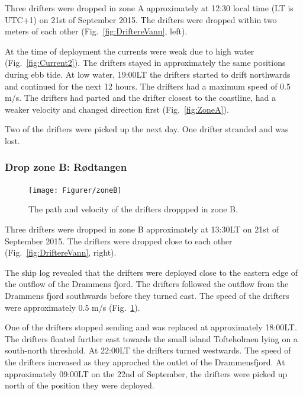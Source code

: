 \documentclass[12pt,a4paper,english]{article}
\begin{document}
Three drifters were dropped in zone A approximately at 12:30 local time (LT is UTC+1) on 21st of September 2015. The drifters were dropped within two meters of each other (Fig.~\ref{fig:DriftereVann}, left).

At the time of deployment the currents were weak due to high water (Fig.~\ref{fig:Current2}). The drifters stayed in approximately the same positions during ebb tide. At low water, 19:00LT the drifters started to drift northwards and continued for the next 12 hours. The drifters had a maximum speed of 0.5 m/s.%
The drifters had parted and the drifter closest to the coastline, had a weaker velocity and changed direction first (Fig.~\ref{fig:ZoneA}). 

Two of the drifters were picked up the next day. One drifter stranded and was lost. 

\subsubsection{Drop zone B: R\o dtangen}
%
\begin{figure}[ht]
\centerline{
\texttt{[image: Figurer/zoneB]}}
\caption{\small
The path and velocity of the drifters droppped in zone B.}
\label{fig:ZoneB}
\end{figure}
%
%
Three drifters were dropped in zone B approximately at 13:30LT on 21st of September 2015. The drifters were dropped close to each other (Fig.~\ref{fig:DriftereVann}, right).

The ship log revealed that the drifters were deployed close to the eastern edge of the outflow of the Drammens fjord. The drifters followed the outflow from the Drammens fjord southwards before they turned east. The speed of the drifters were approximately 0.5 m/s (Fig.~\ref{fig:ZoneB}). %

One of the drifters stopped sending and was replaced at approximately 18:00LT. The drifters floated further east towards the small island Tofteholmen lying on a south-north threshold. At 22:00LT the drifters turned westwards. The speed of the drifters increased as they approched the outlet of the Drammensfjord.%
At approximately 09:00LT on the 22nd of September, the drifters were picked up north of the position they were deployed.
\end{document}
